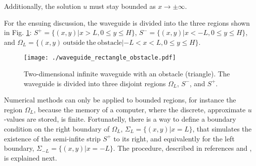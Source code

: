 \documentclass[11pt]{article}
\begin{document}
Additionally, the solution $u$ must stay bounded as $x \rightarrow \pm\infty$.

For the ensuing discussion, the waveguide is divided into the three regions shown in Fig. \ref{fig:waveguide}: $S^+ = \{(x,y)| x > L,  0 \le y \le H\}$, $S^- = \{(x,y)| x < -L,  0 \le y \le H\}$, and $\Omega_L = \{(x,y)~\mathrm{outside}~\mathrm{the}~\mathrm{obstacle}| -L < x < L, 0 \le y \le H\}$.
\begin{figure}[h]
  \centering
  \texttt{[image: ./waveguide\_rectangle\_obstacle.pdf]}
  \caption{Two-dimensional infinite waveguide with an obstacle (triangle). The waveguide is divided into three disjoint regions $\Omega_L$, $S^-$, and $S^+$.}
  \label{fig:waveguide}
\end{figure}

Numerical methods can only be applied to bounded regions, for instance the region $\Omega_L$, because the memory of a computer, where the discrete, approximate $u$-values are stored, is finite. Fortunatelly, there is a way to define a boundary condition on the right boundary of $\Omega_L$, $\Sigma_L = \{(x,y)|x=L\}$, that simulates the existence of the semi-infite strip $S^+$ to its right, and equivalently for the left boundary, $\Sigma_{-L} = \{(x,y)|x=-L\}$. The procedure, described in references  \cite{ihlenburg1998finite} and \cite{chesnel2025tutorial}, is explained next.
\end{document}
